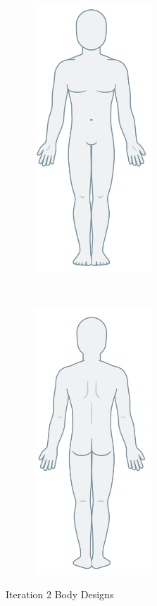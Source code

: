 \begin{figure}[t!]
    \centering
    \begin{subfigure}[t]{0.5\textwidth}
        \centering
        \includegraphics[height=10cm]{figures/bodydesign2front.png}
    \end{subfigure}%
    ~
    \begin{subfigure}[t]{0.5\textwidth}
        \centering
        \includegraphics[height=10cm]{figures/bodydesign2back.png}
    \end{subfigure}
    \caption{Iteration 2 Body Designs}
    \label{fig:it2design}
\end{figure}


